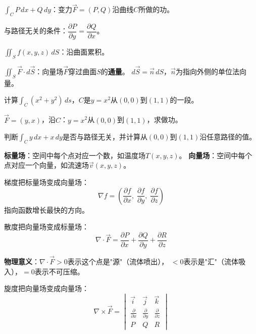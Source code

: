 \documentclass[a4paper,12pt]{ctexart}
\begin{document}
$\int_C P\,dx+Q\,dy$：变力$\vec F=(P,Q)$沿曲线$C$所做的功。

与路径无关的条件：$\dfrac{\partial P}{\partial y}=\dfrac{\partial Q}{\partial x}$。


$\iint_S f(x,y,z)\,dS$：沿曲面累积。


$\iint_S \vec F\cdot d\vec S$：向量场$\vec F$穿过曲面$S$的\textbf{通量}。
$d\vec S = \vec n\,dS$，$\vec n$为指向外侧的单位法向量。


\begin{exercise}
\item 计算$\int_C (x^2+y^2)\,ds$，$C$是$y=x^2$从$(0,0)$到$(1,1)$的一段。
\item $\vec F=(y,x)$，沿$C$：$y=x^2$从$(0,0)$到$(1,1)$，求做功。
\item 判断$\int_C y\,dx+x\,dy$是否与路径无关，并计算从$(0,0)$到$(1,1)$沿任意路径的值。
\end{exercise}

\newpage



\textbf{标量场}：空间中每个点对应一个数，如温度场$T(x,y,z)$。
\textbf{向量场}：空间中每个点对应一个向量，如流速场$\vec v(x,y,z)$。


梯度把标量场变成向量场：
\[
\nabla f = \left(\frac{\partial f}{\partial x},\;\frac{\partial f}{\partial y},\;\frac{\partial f}{\partial z}\right)
\]
指向函数增长最快的方向。


散度把向量场变成标量场：
\[
\nabla\cdot\vec F = \frac{\partial P}{\partial x} + \frac{\partial Q}{\partial y} + \frac{\partial R}{\partial z}
\]

\textbf{物理意义}：$\nabla\cdot\vec F>0$表示这个点是"源"（流体喷出），
$<0$表示是"汇"（流体吸入），$=0$表示不可压缩。


旋度把向量场变成向量场：
\[
\nabla\times\vec F =
\begin{vmatrix}
\vec i & \vec j & \vec k\\
\frac{\partial}{\partial x} & \frac{\partial}{\partial y} & \frac{\partial}{\partial z}\\
P & Q & R
\end{vmatrix}
\]
\end{document}
